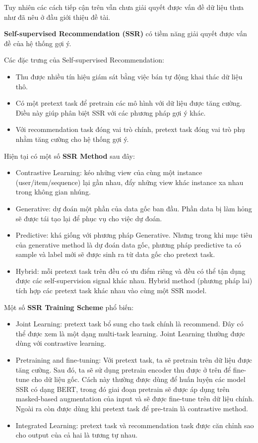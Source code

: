 \documentclass{article}[14pt]
\begin{document}
    Tuy nhiên các cách tiếp cận trên vẫn chưa giải quyết được vấn đề dữ liệu thưa như đã nêu ở đầu giới thiệu đề tài.

    \textbf{Self-supervised Recommendation (SSR)} có tiềm năng giải quyết được vấn đề của hệ thống gợi ý.

    Các đặc trưng của Self-supervised Recommendation:
    \begin{itemize}[leftmargin=10mm]
        \item Thu được nhiều tín hiệu giám sát bằng việc bán tự động khai thác dữ liệu thô.
        \item Có một pretext task để pretrain các mô hình với dữ liệu được tăng cường. Điều này giúp phân biệt SSR với các phương pháp gợi ý khác.
        \item Với recommendation task đóng vai trò chính, pretext task đóng vai trò phụ nhằm tăng cường cho hệ thống gợi ý.
    \end{itemize}

    Hiện tại có một số \textbf{SSR Method} \cite{sslsurvey} sau đây:
    \begin{itemize}[leftmargin=10mm]
        \item Contrastive Learning: kéo những view của cùng một instance (user/item/sequence) lại gần nhau, đẩy những view khác instance xa nhau trong không gian nhúng.
        \item Generative: dự đoán một phần của data gốc ban đầu. Phần data bị làm hỏng sẽ được tái tạo lại để phục vụ cho việc dự đoán.
        \item Predictive: khá giống với phương pháp Generative. Nhưng trong khi mục tiêu của generative method là dự đoán data gốc, phương pháp predictive ta có sample và label mới sẽ được sinh ra từ data gốc cho pretext task.
        \item Hybrid: mỗi pretext task trên đều có ưu điểm riêng và đều có thể tận dụng được các self-supervision signal khác nhau. Hybrid method (phương pháp lai) tích hợp các pretext task khác nhau vào cùng một SSR model.
    \end{itemize}

    Một số \textbf{SSR Training Scheme} \cite{sslsurvey} phổ biến:
    \begin{itemize}[leftmargin=10mm]
        \item Joint Learning: pretext task bổ sung cho task chính là recommend. Đây có thể được xem là một dạng multi-task learning. Joint Learning thường được dùng với contrastive learning.
        \item Pretraining and fine-tuning: Với pretext task, ta sẽ pretrain trên dữ liệu được tăng cường. Sau đó, ta sẽ sử dụng pretrain encoder thu được ở trên để fine-tune cho dữ liệu gốc. Cách này thường được dùng để huấn luyện các model SSR có dạng BERT, trong đó giai đoạn pretrain sẽ được áp dụng trên masked-based augmentation của input và sẽ được fine-tune trên dữ liệu chính. Ngoài ra còn được dùng khi pretext task để pre-train là contrastive method.
        \item Integrated Learning: pretext task và recommendation task được căn chỉnh sao cho output của cả hai là tương tự nhau.
    \end{itemize}
\end{document}
